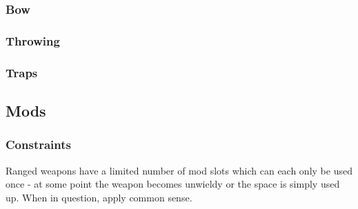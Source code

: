 \pagebreak
\subsubsection{Bow}
\vspace{8mm}
\begin{multicols}{2}
\end{multicols}

\hrulefill
\subsubsection{Throwing}
\vspace{8mm}
\begin{multicols}{2}
\end{multicols}

\pagebreak %
\subsubsection{Traps}
\vspace{8mm}
\begin{multicols}{2}
\end{multicols}

\pagebreak %
\subsection{Mods}
\subsubsection{Constraints}
Ranged weapons have a limited number of mod slots which can each only be used once - at some point the weapon becomes unwieldy or the space is simply used up. When in question, apply common sense.
\par

